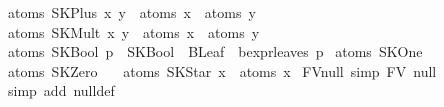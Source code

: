 \begin{isabellebody}
{}\ {}atoms\ {}SKPlus\ x\ y{}\ {}\ atoms\ x\ {}\ atoms\ y{}\isanewline
{}\ {}atoms\ {}SKMult\ x\ y{}\ {}\ atoms\ x\ {}\ atoms\ y{}\isanewline
{}\ {}atoms\ {}SKBool\ p{}\ {}\ SKBool\ {}\ BLeaf\ {}\ bexpr{}leaves\ p{}\isanewline
{}\ {}atoms\ SKOne\ {}\ {}{}{}\isanewline
{}\ {}atoms\ SKZero\ {}\ {}{}{}\isanewline
{}\ {}atoms\ {}SKStar\ x{}\ {}\ atoms\ x{}\isanewline
\isanewline
{}\isamarkupfalse%
\ FV{}null\ {}simp{}{}\ {}FV\ null\ {}\ {}{}{}\isanewline
%
\isadelimproof
\ \ %
\endisadelimproof
%
\isatagproof
{}\isamarkupfalse%
\ {}simp\ add{}\ null{}def{}%
\endisatagproof
{\isafoldproof}%
%
\isadelimproof
\isanewline
%
\endisadelimproof
\isanewline
{}\isamarkupfalse%

\end{isabellebody}
